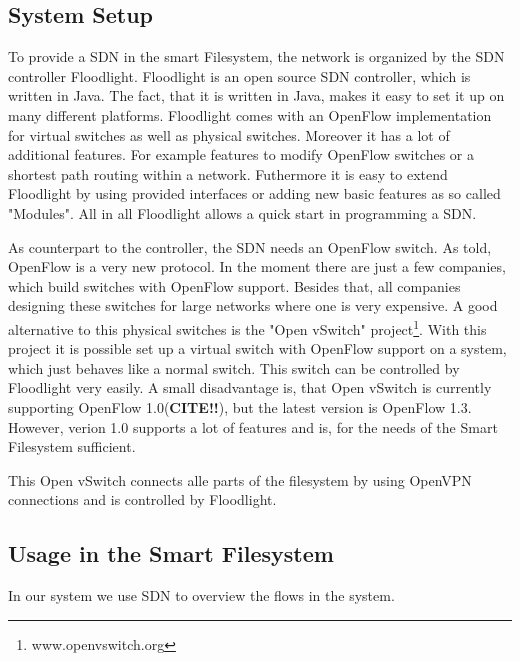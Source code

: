 \subsection{System Setup}
To provide a SDN in the smart Filesystem, the network is organized by the SDN controller Floodlight\cite{flood}. Floodlight is an open source SDN controller, which is written in Java. The fact, that it is written in Java, makes it easy to set it up on many different platforms. Floodlight comes with an OpenFlow implementation for virtual switches as well as physical switches. Moreover it has a lot of additional features. For example features to modify OpenFlow switches or a shortest path routing within a network. Futhermore it is easy to extend Floodlight by using provided interfaces or adding new basic features as so called "Modules". All in all Floodlight allows a quick start in programming a SDN.

As counterpart to the controller, the SDN needs an OpenFlow switch. As told, OpenFlow is a very new protocol. In the moment there are just a few companies, which build switches with OpenFlow support. Besides that, all companies designing these switches for large networks where one is very expensive. A good alternative to this physical switches is the "Open vSwitch" project\footnote{www.openvswitch.org}. With this project it is possible set up a virtual switch with OpenFlow support on a system, which just behaves like a normal switch. This switch can be controlled by Floodlight very easily. A small disadvantage is, that Open vSwitch is currently supporting OpenFlow 1.0(\textbf{CITE!!}), but the latest version is OpenFlow 1.3. However, verion 1.0 supports a lot of features and is, for the needs of the Smart Filesystem sufficient.

This Open vSwitch connects alle parts of the filesystem by using OpenVPN connections and is controlled by Floodlight.     
   
\subsection{Usage in the Smart Filesystem}
In our system we use SDN to overview the flows in the system.   




          